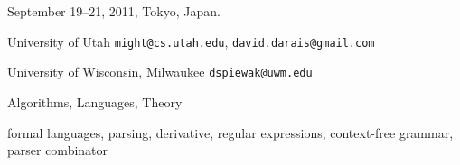 \documentclass{sigplanconf}
\begin{document}
 {September 19--21, 2011, Tokyo, Japan.}


\titlebanner{\mytitlebanner}        %
\preprintfooter{\footertitle}       %

\title{\mytitle}
\subtitle{\mysubtitle}

           {University of Utah}
           {\texttt{might@cs.utah.edu}, \texttt{david.darais@gmail.com}}


           {University of Wisconsin, Milwaukee}
           {\texttt{dspiewak@uwm.edu}}
\maketitle

\begin{abstract}
  
\end{abstract}

 
\terms Algorithms, Languages, Theory
 
\keywords formal languages, parsing, derivative, regular expressions,
context-free grammar, parser combinator






\end{document}
